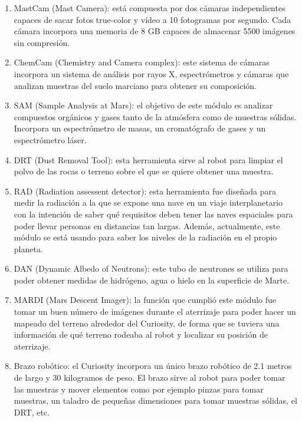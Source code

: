 \begin{enumerate}
  \item MastCam (Mast Camera): está compuesta por dos cámaras independientes capaces de sacar fotos true-color y vídeo a 10 fotogramas por segundo. Cada cámara incorpora una memoria de 8 GB capaces de almacenar 5500 imágenes sin compresión.
  \item ChemCam (Chemistry and Camera complex): este sistema de cámaras incorpora un sistema de análisis por rayos X, espectrómetros y cámaras que analizan muestras del suelo marciano para obtener su composición.
  \item SAM (Sample Analysis at Mars): el objetivo de este módulo es analizar compuestos orgánicos y gases tanto de la atmósfera como de muestras sólidas. Incorpora un espectrómetro de masas, un cromatógrafo de gases y un espectrómetro láser.
  \item DRT (Dust Removal Tool): esta herramienta sirve al robot para limpiar el polvo de las rocas o terreno sobre el que se quiere obtener una muestra.
  \item RAD (Radiation assessent detector): esta herramienta fue diseñada para medir la radiación a la que se expone una nave en un viaje interplanetario con la intención de saber qué requisitos deben tener las naves espaciales para poder llevar personas en distancias tan largas. Además, actualmente, este módulo se está usando para saber los niveles de la radiación en el propio planeta.
  \item DAN (Dynamic Albedo of Neutrons): este tubo de neutrones se utiliza para poder obtener medidas de hidrógeno, agua o hielo en la superficie de Marte.
  \item MARDI (Mars Descent Imager): la función que cumplió este módulo fue tomar un buen número de imágenes durante el aterrizaje para poder hacer un mapeado del terreno alrededor del Curiosity, de forma que se tuviera una información de qué terreno rodeaba al robot y localizar su posición de aterrizaje.
  \item Brazo robótico: el Curiosity incorpora un único brazo robótico de 2.1 metros de largo y 30 kilogramos de peso. El brazo sirve al robot para poder tomar las muestras y mover elementos como por ejemplo pinzas para tomar muestras, un taladro de pequeñas dimensiones para tomar muestras sólidas, el DRT, etc.
\end{enumerate}

